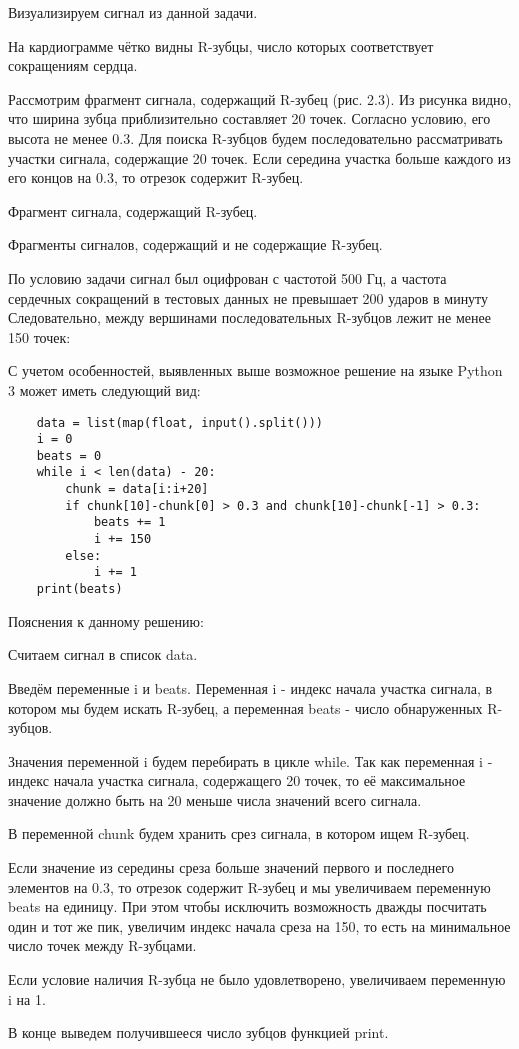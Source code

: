 \solutionSection

Визуализируем сигнал из данной задачи.

На кардиограмме чётко видны R-зубцы, число которых соответствует сокращениям сердца.


Рассмотрим фрагмент сигнала, содержащий R-зубец (рис. 2.3). Из рисунка видно, что ширина зубца приблизительно составляет 20 точек. Согласно условию, его высота не менее 0.3. Для поиска R-зубцов будем последовательно рассматривать участки сигнала, содержащие 20 точек. Если середина участка больше каждого из его концов на 0.3, то отрезок содержит R-зубец.

Фрагмент сигнала, содержащий R-зубец.


Фрагменты сигналов, содержащий и не содержащие R-зубец.


По условию задачи сигнал был оцифрован с частотой 500 Гц, а частота сердечных сокращений в тестовых данных не превышает 200 ударов в минуту
Следовательно, между вершинами последовательных R-зубцов лежит не менее 150 точек:


С учетом особенностей, выявленных выше возможное решение на языке Python 3 может иметь следующий вид:

\begin{verbatim}
    data = list(map(float, input().split()))
    i = 0
    beats = 0
    while i < len(data) - 20:
        chunk = data[i:i+20]
        if chunk[10]-chunk[0] > 0.3 and chunk[10]-chunk[-1] > 0.3: 
            beats += 1            
            i += 150          
        else:
            i += 1
    print(beats)
\end{verbatim}

Пояснения к данному решению:

Считаем сигнал в список data.

Введём переменные i и beats. Переменная i - индекс начала участка сигнала, в котором мы будем искать R-зубец, а переменная beats - число обнаруженных R-зубцов.

Значения переменной i будем перебирать в цикле while. Так как переменная i - индекс начала участка сигнала, содержащего 20 точек, то её максимальное значение должно быть на 20 меньше числа значений всего сигнала.

В переменной chunk будем хранить срез сигнала, в котором ищем R-зубец.

Если значение из середины среза больше значений первого и последнего элементов на 0.3, то отрезок содержит R-зубец и мы увеличиваем переменную beats на единицу. При этом чтобы исключить возможность дважды посчитать один и тот же пик, увеличим индекс начала среза на 150, то есть на минимальное число точек между R-зубцами.

Если условие наличия R-зубца не было удовлетворено, увеличиваем переменную i на 1.

В конце выведем получившееся число зубцов функцией print.


